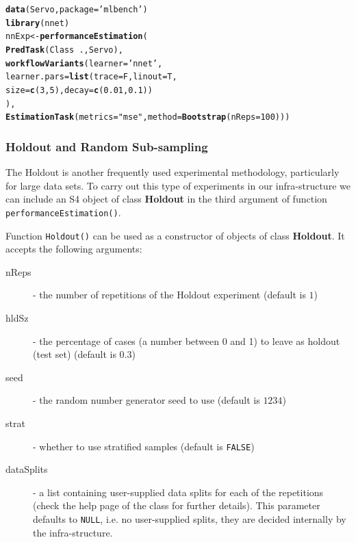 \documentclass[10pt,a4paper]{article}\usepackage[]{graphicx}\usepackage[]{color}
\makeatletter
\newcommand{\hlnum}[1]{\textcolor[rgb]{0.686,0.059,0.569}{#1}}%
\newcommand{\hlstr}[1]{\textcolor[rgb]{0.192,0.494,0.8}{#1}}%
\newcommand{\hlopt}[1]{\textcolor[rgb]{0,0,0}{#1}}%
\newcommand{\hlstd}[1]{\textcolor[rgb]{0.345,0.345,0.345}{#1}}%
\newcommand{\hlkwb}[1]{\textcolor[rgb]{0.69,0.353,0.396}{#1}}%
\newcommand{\hlkwc}[1]{\textcolor[rgb]{0.333,0.667,0.333}{#1}}%
\newcommand{\hlkwd}[1]{\textcolor[rgb]{0.737,0.353,0.396}{\textbf{#1}}}%
\newenvironment{kframe}{%
 \def\at@end@of@kframe{}%
 \ifinner\ifhmode%
  \def\at@end@of@kframe{\end{minipage}}%
  \begin{minipage}{\columnwidth}%
 \fi\fi%
 \def\FrameCommand##1{\hskip\@totalleftmargin \hskip-\fboxsep
 \colorbox{shadecolor}{##1}\hskip-\fboxsep
     \hskip-\linewidth \hskip-\@totalleftmargin \hskip\columnwidth}%
 \MakeFramed {\advance\hsize-\width
   \@totalleftmargin\z@ \linewidth\hsize
   \@setminipage}}%
 {\par\unskip\endMakeFramed%
 \at@end@of@kframe}
\newenvironment{knitrout}{}{} %
\makeatother
\begin{document}
\begin{knitrout}\footnotesize
{}\color{fgcolor}\begin{kframe}
\begin{alltt}
\hlkwd{data}\hlstd{(Servo,}\hlkwc{package}\hlstd{=}\hlstr{'mlbench'}\hlstd{)}
\hlkwd{library}\hlstd{(nnet)}
\hlstd{nnExp} \hlkwb{<-} \hlkwd{performanceEstimation}\hlstd{(}
  \hlkwd{PredTask}\hlstd{(Class} \hlopt{~} \hlstd{.,Servo),}
  \hlkwd{workflowVariants}\hlstd{(}\hlkwc{learner}\hlstd{=}\hlstr{'nnet'}\hlstd{,}
                   \hlkwc{learner.pars}\hlstd{=}\hlkwd{list}\hlstd{(}\hlkwc{trace}\hlstd{=F,}\hlkwc{linout}\hlstd{=T,}
                       \hlkwc{size}\hlstd{=}\hlkwd{c}\hlstd{(}\hlnum{3}\hlstd{,}\hlnum{5}\hlstd{),}\hlkwc{decay}\hlstd{=}\hlkwd{c}\hlstd{(}\hlnum{0.01}\hlstd{,}\hlnum{0.1}\hlstd{))}
          \hlstd{),}
  \hlkwd{EstimationTask}\hlstd{(}\hlkwc{metrics}\hlstd{=}\hlstr{"mse"}\hlstd{,}\hlkwc{method}\hlstd{=}\hlkwd{Bootstrap}\hlstd{(}\hlkwc{nReps}\hlstd{=}\hlnum{100}\hlstd{)))}
\end{alltt}
\end{kframe}
\end{knitrout}

\subsubsection{Holdout and Random Sub-sampling}

The Holdout is another frequently used experimental methodology,
particularly for large data sets. To carry out this type of
experiments in our infra-structure we can include an S4 object of
class \textbf{Holdout} in the third argument of function
\texttt{performanceEstimation()}.

Function \texttt{Holdout()} can be used as a constructor of
objects of class \textbf{Holdout}. It accepts the following
arguments:

\begin{description}
\item[nReps] - the number of repetitions of the Holdout experiment (default is $1$)
\item[hldSz] - the percentage  of cases (a number between 0 and 1) to leave as holdout (test set) (default is $0.3$)
\item[seed] - the random number generator seed to use (default is $1234$)
\item[strat] - whether to use stratified samples (default is \texttt{FALSE})
\item[dataSplits] - a list containing user-supplied data splits
  for each of the repetitions (check the help page of the
  class for further details). This parameter defaults to
  \texttt{NULL}, i.e. no user-supplied splits, they are decided
  internally by the infra-structure.
\end{description}
\end{document}
